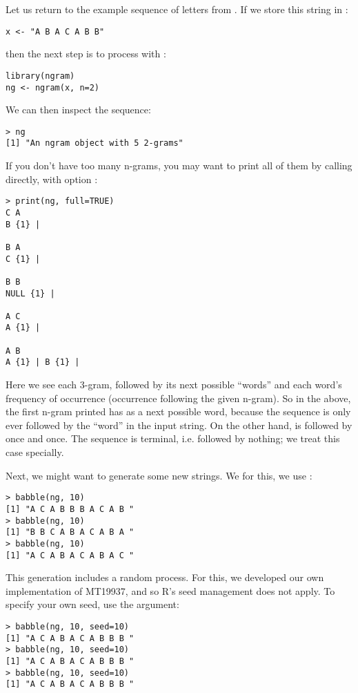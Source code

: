 Let us return to the example sequence of letters from .  If 
we store this string in :

\begin{lstlisting}[language=rr]
x <- "A B A C A B B"
\end{lstlisting}

then the next step is to process with :

\begin{lstlisting}[language=rr]
library(ngram)
ng <- ngram(x, n=2)
\end{lstlisting}

We can then inspect the sequence:

\begin{lstlisting}[language=inteRactive]
> ng
[1] "An ngram object with 5 2-grams"
\end{lstlisting}

If you don't have too many n-grams, you may want to print all of them by 
calling 
 directly, with option :
\begin{lstlisting}[language=inteRactive]
> print(ng, full=TRUE)
C A 
B {1} | 

B A 
C {1} | 

B B 
NULL {1} | 

A C 
A {1} | 

A B 
A {1} | B {1} | 
\end{lstlisting}

Here we see each 3-gram, followed by its next possible ``words'' and each 
word's frequency of occurrence (occurrence following the given n-gram).  So in 
the above, the first n-gram printed  has  as a next 
possible word, because the sequence  is only ever followed by the 
``word''  in the input string.  On the other hand,  is 
followed by  once and  once.  The sequence  is 
terminal, i.e. followed by nothing; we treat this case specially.

Next, we might want to generate some new strings.  We for this, we use 
:

\begin{lstlisting}[language=inteRactive]
> babble(ng, 10)
[1] "A C A B B B A C A B "
> babble(ng, 10)
[1] "B B C A B A C A B A "
> babble(ng, 10)
[1] "A C A B A C A B A C "
\end{lstlisting}

This generation includes a random process.  For this, we developed our own 
implementation of MT19937, and so R's seed management does not apply.  To 
specify your own seed, use the  argument:
\begin{lstlisting}[language=inteRactive]
> babble(ng, 10, seed=10)
[1] "A C A B A C A B B B "
> babble(ng, 10, seed=10)
[1] "A C A B A C A B B B "
> babble(ng, 10, seed=10)
[1] "A C A B A C A B B B "
\end{lstlisting}




